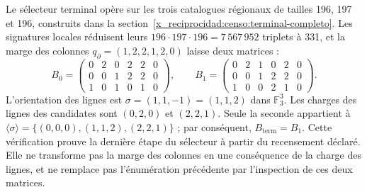 Le sélecteur terminal opère sur les trois catalogues régionaux
de tailles 196, 197 et 196, construits dans la
section~\ref{x_reciprocidad:censo:terminal-completo}. Les signatures locales réduisent leurs
\(196\cdot197\cdot196=7\,567\,952\) triplets à 331, et la marge des
colonnes \(q_{\partial}=(1,2,2,1,2,0)\) laisse deux matrices :
\[
 B_0=\begin{pmatrix}0&2&0&2&2&0\\0&0&1&2&2&0\\1&0&1&0&1&0\end{pmatrix},
 \qquad
 B_1=\begin{pmatrix}0&2&1&0&2&0\\0&0&1&2&2&0\\1&0&0&2&1&0\end{pmatrix}.
\]
L'orientation des lignes est \(\sigma=(1,1,-1)=(1,1,2)\) dans
\(\mathbb F_3^3\). Les charges des lignes des candidates sont
\((0,2,0)\) et \((2,2,1)\). Seule la seconde appartient à
\(\langle\sigma\rangle=\{(0,0,0),(1,1,2),(2,2,1)\}\) ; par conséquent,
\(B_{\mathrm{term}}=B_1\). Cette vérification prouve la dernière étape du
sélecteur à partir du recensement déclaré. Elle ne transforme pas la marge des colonnes
en une conséquence de la charge des lignes, et ne remplace pas l'énumération
précédente par l'inspection de ces deux matrices.

